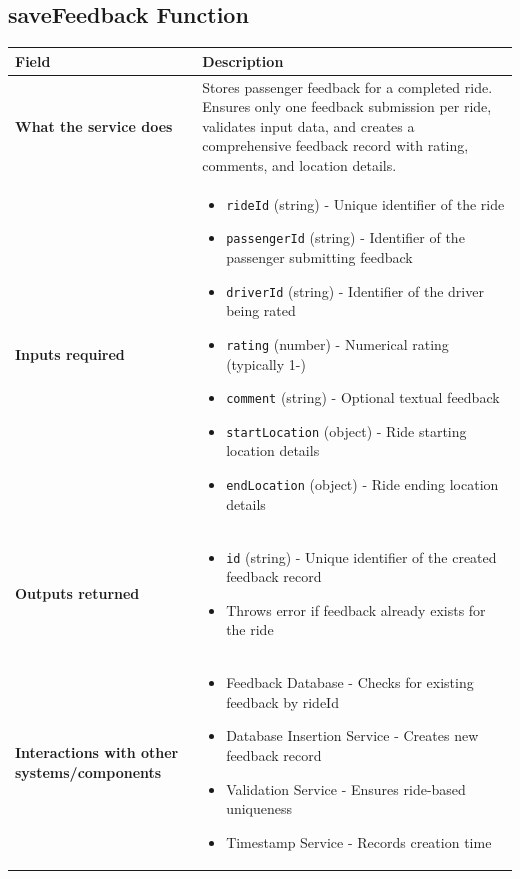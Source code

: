 \documentclass[11pt,a4paper]{article}
\begin{document}
\subsection{saveFeedback Function}

\begin{longtable}{|p{4cm}|p{12cm}|}
\hline
\textbf{Field} & \textbf{Description} \\
\hline
\textbf{What the service does} & 
Stores passenger feedback for a completed ride. Ensures only one feedback submission per ride, validates input data, and creates a comprehensive feedback record with rating, comments, and location details. \\
\hline
\textbf{Inputs required} & 
\begin{itemize}[nosep]
\item \texttt{rideId} (string) - Unique identifier of the ride
\item \texttt{passengerId} (string) - Identifier of the passenger submitting feedback
\item \texttt{driverId} (string) - Identifier of the driver being rated
\item \texttt{rating} (number) - Numerical rating (typically 1-)
\item \texttt{comment} (string) - Optional textual feedback
\item \texttt{startLocation} (object) - Ride starting location details
\item \texttt{endLocation} (object) - Ride ending location details
\end{itemize} \\
\hline
\textbf{Outputs returned} & 
\begin{itemize}[nosep]
\item \texttt{id} (string) - Unique identifier of the created feedback record
\item Throws error if feedback already exists for the ride
\end{itemize} \\
\hline
\textbf{Interactions with other systems/components} & 
\begin{itemize}[nosep]
\item Feedback Database - Checks for existing feedback by rideId
\item Database Insertion Service - Creates new feedback record
\item Validation Service - Ensures ride-based uniqueness
\item Timestamp Service - Records creation time
\end{itemize} \\

\end{longtable}
\end{document}
